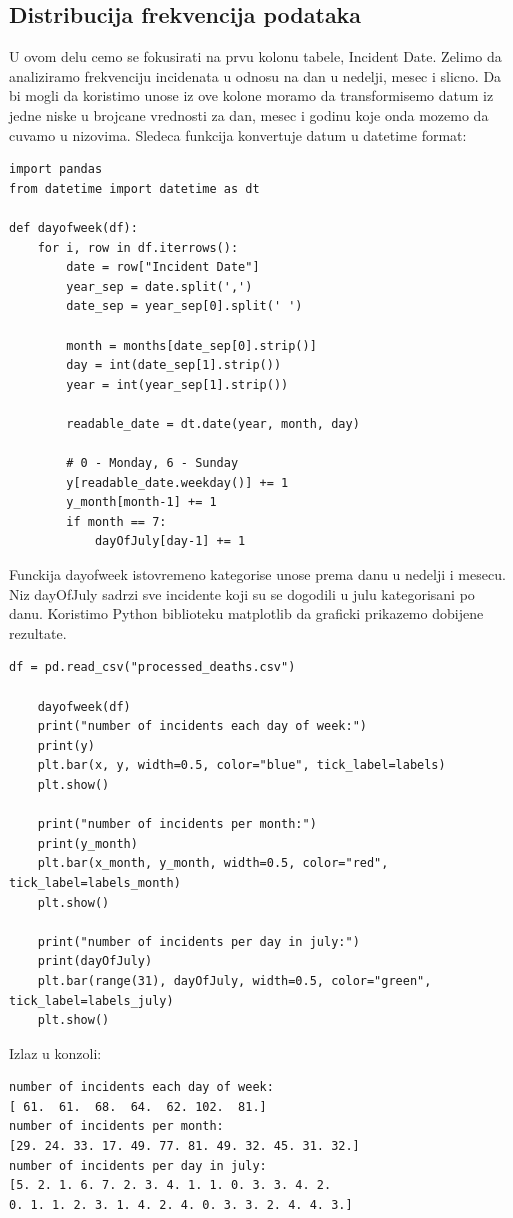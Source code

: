 \documentclass[11pt]{article} %
\begin{document}
\subsection{Distribucija frekvencija podataka}
U ovom delu cemo se fokusirati na prvu kolonu tabele, Incident Date. Zelimo da analiziramo frekvenciju incidenata u odnosu na dan u nedelji, mesec i slicno.
Da bi mogli da koristimo unose iz ove kolone moramo da transformisemo datum iz jedne niske u brojcane vrednosti za dan, mesec i godinu koje onda mozemo
da cuvamo u nizovima. Sledeca funkcija konvertuje datum u datetime format:
\begin{lstlisting}
import pandas
from datetime import datetime as dt

def dayofweek(df):
	for i, row in df.iterrows():
		date = row["Incident Date"]
		year_sep = date.split(',')
		date_sep = year_sep[0].split(' ')

		month = months[date_sep[0].strip()]
		day = int(date_sep[1].strip())
		year = int(year_sep[1].strip())

		readable_date = dt.date(year, month, day)

		# 0 - Monday, 6 - Sunday
		y[readable_date.weekday()] += 1
		y_month[month-1] += 1
		if month == 7:
			dayOfJuly[day-1] += 1
\end{lstlisting}
Funckija dayofweek istovremeno kategorise unose prema danu u nedelji i mesecu. Niz dayOfJuly sadrzi sve incidente koji su se dogodili u julu kategorisani po danu.
Koristimo Python biblioteku matplotlib da graficki prikazemo dobijene rezultate.
\begin{lstlisting}
df = pd.read_csv("processed_deaths.csv")

	dayofweek(df)
	print("number of incidents each day of week:")
	print(y)
	plt.bar(x, y, width=0.5, color="blue", tick_label=labels)
	plt.show()

	print("number of incidents per month:")
	print(y_month)
	plt.bar(x_month, y_month, width=0.5, color="red", tick_label=labels_month)
	plt.show()
	
	print("number of incidents per day in july:")
	print(dayOfJuly)
	plt.bar(range(31), dayOfJuly, width=0.5, color="green", tick_label=labels_july)
	plt.show()
\end{lstlisting}
Izlaz u konzoli:
\begin{lstlisting}
number of incidents each day of week:
[ 61.  61.  68.  64.  62. 102.  81.]
number of incidents per month:
[29. 24. 33. 17. 49. 77. 81. 49. 32. 45. 31. 32.]
number of incidents per day in july:
[5. 2. 1. 6. 7. 2. 3. 4. 1. 1. 0. 3. 3. 4. 2. 
0. 1. 1. 2. 3. 1. 4. 2. 4. 0. 3. 3. 2. 4. 4. 3.]
\end{lstlisting}
\end{document}
